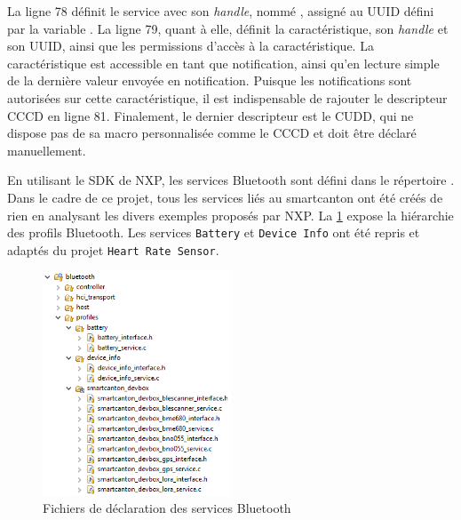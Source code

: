 La ligne 78 définit le service avec son \textit{handle}, nommé , assigné au UUID défini par la variable . La ligne 79, quant à elle, définit la caractéristique, son \textit{handle} et son UUID, ainsi que les permissions d'accès à la caractéristique. La caractéristique  est accessible en tant que notification, ainsi qu'en lecture simple de la dernière valeur envoyée en notification. Puisque les notifications sont autorisées sur cette caractéristique, il est indispensable de rajouter le descripteur CCCD en ligne 81. Finalement, le dernier descripteur est le CUDD, qui ne dispose pas de sa macro personnalisée comme le CCCD et doit être déclaré manuellement.

En utilisant le SDK de NXP, les services Bluetooth sont défini dans le répertoire . Dans le cadre de ce projet, tous les services liés au smartcanton ont été créés de rien en analysant les divers exemples proposés par NXP. La \cref{fig-ble_services_paths} expose la hiérarchie des profils Bluetooth. Les services \texttt{Battery} et \texttt{Device Info} ont été repris et adaptés du projet \texttt{Heart Rate Sensor}.

\begin{figure}[ht!]
    \centering
    \includegraphics[width=0.50\textwidth]{Figures/Software/kw41z/ble_services_paths.png}
    \caption{Fichiers de déclaration des services Bluetooth}
    \label{fig-ble_services_paths}
\end{figure}



\FloatBarrier
{}

